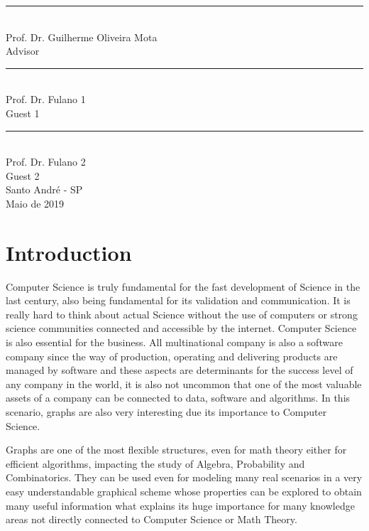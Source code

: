 \documentclass[12pt,twoside,a4paper]{book}
\numberwithin{equation}{section}
\theoremstyle{remark}
\begin{document}
    \vspace{2.5 cm}
    \begin{center}
    \rule{10.0 cm}{0.02 cm}\\
    Prof. Dr. Guilherme Oliveira Mota\\
    Advisor\\
    
    \vspace{1.0 cm}
    \rule{10.0 cm}{0.02 cm}\\
    Prof. Dr. Fulano 1\\
    Guest 1\\
    
    \vspace{1.0 cm}
    \rule{10.0 cm}{0.02 cm}\\
    Prof. Dr. Fulano 2\\
    Guest 2\\
   
   \vfill
Santo André - SP\\
Maio de 2019
\end{center}

\tableofcontents
\listoffigures

\chapter{Introduction}
Computer Science is truly fundamental for the fast development of Science in the last century, also being fundamental for its validation and communication. It is really hard to think about actual Science without the use of computers or strong science communities connected and accessible by the internet. Computer Science is also essential for the business. All multinational company is also a software company since the way of production, operating and delivering products are managed by software and these aspects are determinants for the success level of any company in the world, it is also not uncommon that one of the most valuable assets of a company can be connected to data, software and algorithms. In this scenario, graphs are also very interesting due its importance to Computer Science.

Graphs are one of the most flexible structures, even for math theory either for efficient algorithms, impacting the study of Algebra, Probability and Combinatorics. They can be used even for modeling many real scenarios in a very easy understandable graphical scheme whose properties can be explored to obtain many useful information what explains its huge importance for many knowledge areas not directly connected to Computer Science or Math Theory.   
\end{document}

